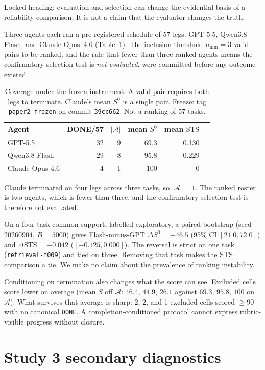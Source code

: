 \documentclass[sigconf,anonymous]{aamas}
\newcommand{\task}[1]{\texttt{#1}}
\newcommand{\A}{\mathcal{A}}
\newcommand{\STS}{\mathrm{STS}}
\begin{document}
Locked heading: evaluation and selection can change the evidential basis of a reliability comparison.
It is not a claim that the evaluator changes the truth.

Three agents each ran a pre-registered schedule of 57 legs: GPT-5.5, Qwen3.8-Flash, and Claude Opus~4.6 (Table~\ref{tab:coverage}).
The inclusion threshold $n_{\min}=3$ valid pairs to be ranked, and the rule that fewer than three ranked agents means the confirmatory selection test is \emph{not evaluated}, were committed before any outcome existed.

\begin{table}[H]
\centering
\caption{Coverage under the frozen instrument. A valid pair requires both legs to terminate. Claude's mean $S^{0}$ is a single pair. Freeze: tag \texttt{paper2-frozen} on commit \texttt{39cc662}. Not a ranking of 57 tasks.}
\label{tab:coverage}
\small
\begin{tabular}{lrrrrr}
\toprule
Agent & DONE/57 & $|\A|$ & mean $S^{0}$ & mean $\STS$ \\
\midrule
GPT-5.5         & 32 & 9 & 69.3 & 0.130 \\
Qwen3.8-Flash   & 29 & 8 & 95.8 & 0.229 \\
Claude Opus 4.6 &  4 & 1 & 100  & 0 \\
\bottomrule
\end{tabular}
\end{table}

Claude terminated on four legs across three tasks, so $|\A|=1$.
The ranked roster is two agents, which is fewer than three, and the confirmatory selection test is therefore not evaluated.

On a four-task common support, labelled exploratory, a paired bootstrap (seed $20260904$, $B=5000$) gives Flash-minus-GPT $\Delta S^{0}=+46.5$ (95\% CI $[21.0,72.0]$) and $\Delta\STS=-0.042$ ($[-0.125,0.000]$).
The reversal is strict on one task (\task{retrieval-f009}) and tied on three.
Removing that task makes the $\STS$ comparison a tie.
We make no claim about the prevalence of ranking instability.

Conditioning on termination also changes what the score can see.
Excluded cells score lower on average (mean $S$ off $\A$: $46.4$, $44.9$, $26.1$ against $69.3$, $95.8$, $100$ on $\A$).
What survives that average is sharp: 2, 2, and 1 excluded cells scored $\ge 90$ with no canonical \texttt{DONE}.
A completion-conditioned protocol cannot express rubric-visible progress without closure.

\section{Study 3 secondary diagnostics}
\label{app:s3}
\end{document}

